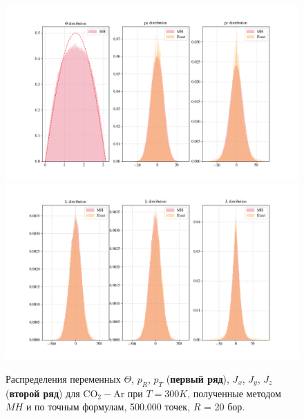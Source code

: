 \begin{figure}[!ht]
	\includegraphics[width=\textwidth]{../pictures/co2arDistributions1.png}
	\includegraphics[width=\textwidth]{../pictures/co2arDistributions2.png}
	\caption{Распределения переменных $\Theta$, $p_R$, $p_T$ (\textbf{первый ряд}), $J_x$, $J_y$, $J_z$ (\textbf{второй ряд}) для CO$_2-$Ar при $T = 300 K$, полученные методом $MH$ и по точным формулам, 500.000 точек, $R$ = 20 бор.}
	\label{fig:co2ar_comparison}
\end{figure}



